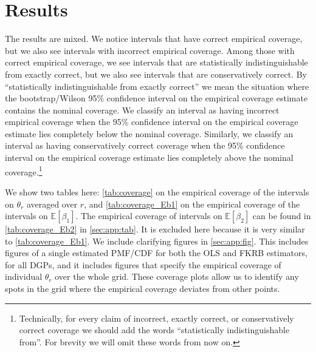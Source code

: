 \section{Results}
\label{sec:results}
The results are mixed.
We notice intervals that have correct empirical coverage, but we also see intervals with incorrect empirical coverage.
Among those with correct empirical coverage, we see intervals that are statistically indistinguishable from exactly correct, but we also see intervals that are conservatively correct.
By ``statistically indistinguishable from exactly correct'' we mean the situation where the bootstrap/Wilson 95\% confidence interval on the empirical coverage estimate contains the nominal coverage.
We classify an interval as having incorrect empirical coverage when the 95\% confidence interval on the empirical coverage estimate lies completely below the nominal coverage.
Similarly, we classify an interval as having conservatively correct coverage when the 95\% confidence interval on the empirical coverage estimate lies completely above the nominal coverage.\footnote{Technically, for every claim of incorrect, exactly correct, or conservatively correct coverage we should add the words ``statistically indistinguishable from''. For brevity we will omit these words from now on.}

We show two tables here: \cref{tab:coverage} on the empirical coverage of the intervals on $\theta_r$ averaged over $r$, and \cref{tab:coverage_Eb1} on the empirical coverage of the intervals on $\mathbb{E}[\beta_1]$.
The empirical coverage of intervals on $\mathbb{E}[\beta_2]$ can be found in \cref{tab:coverage_Eb2} in \cref{sec:app:tab}.
It is excluded here because it is very similar to \cref{tab:coverage_Eb1}.
We include clarifying figures in \cref{sec:app:fig}.
This includes figures of a single estimated PMF/CDF for both the OLS and FKRB estimators, for all DGPs, and it includes figures that specify the empirical coverage of individual $\theta_r$ over the whole grid.
These coverage plots allow us to identify any spots in the grid where the empirical coverage deviates from other points.


